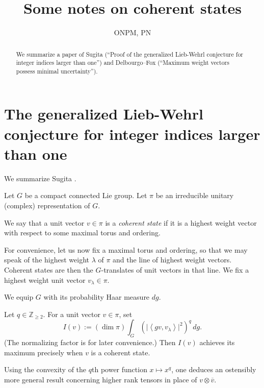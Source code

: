 \documentclass[reqno]{amsart} 
\begin{document}
\author{ONPM, PN}
\title{Some notes on coherent states}


\begin{abstract}
  We summarize a paper of Sugita (``Proof of the generalized Lieb-Wehrl conjecture for integer indices larger than one'') and Delbourgo--Fox (``Maximum weight vectors possess minimal uncertainty'').
\end{abstract}

\maketitle

\section{The generalized Lieb-Wehrl conjecture for integer indices larger than one}\label{sec:cngub4lfbx}
We summarize Sugita \cite{MR1946863}.

Let $G$ be a compact connected Lie group.  Let $\pi$ be an irreducible unitary (complex) representation of $G$.

\begin{definition}\label{definition:cngsx0l9k6}
  We say that a unit vector $v \in \pi$ is a \emph{coherent state} if it is a highest weight vector with respect to some maximal torus and ordering.
\end{definition}

For convenience, let us now fix a maximal torus and ordering, so that we may speak of the highest weight $\lambda$ of $\pi$ and the line of highest weight vectors.  Coherent states are then the $G$-translates of unit vectors in that line.  We fix a highest weight unit vector $v_\lambda \in \pi$.

We equip $G$ with its probability Haar measure $d g$.

\begin{theorem}\label{theorem:cngsx0yg7y}
  Let $q \in \mathbb{Z}_{\geq 2}$.  For a unit vector $v \in \pi$, set
  \begin{equation*}
    I(v) :=
    (\dim \pi)
    \int_{G}
    \left( \lvert \left\langle g v, v_\lambda \right\rangle \rvert^2 \right)^q
    \, d g.
  \end{equation*}
  (The normalizing factor is for later convenience.)  Then $I(v)$ achieves its maximum precisely when $v$ is a coherent state.
\end{theorem}
\begin{remark}\label{remark:cngsx0yf26}
  Using the convexity of the $q$th power function $x \mapsto x^q$, one deduces an ostensibly more general result concerning higher rank tensors in place of $v \otimes \overline{v}$.
\end{remark}
\end{document}
